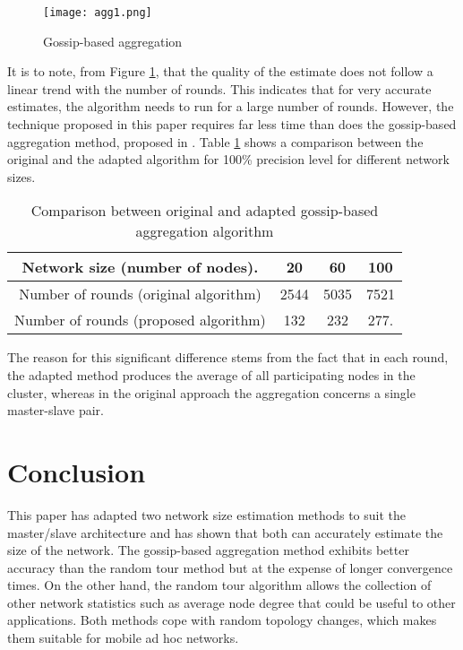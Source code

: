 \documentclass[twocolumn,10pt,conference]{IEEEtran}
\begin{document}
\begin{figure}[h!]
\begin{center}
\texttt{[image: agg1.png]}
\caption{Gossip-based aggregation}
\label{aggr}
\end{center}
\end{figure}

It is to note, from Figure \ref{aggr}, that the quality of the estimate does not follow a linear trend with the number of rounds. 
This indicates that for very accurate estimates, the algorithm needs to run for a large number of rounds. However, the 
technique proposed in this paper requires far less time than does the gossip-based aggregation method, proposed in 
\cite{ref22}. Table \ref{tbl} shows a comparison between the original and the adapted algorithm for 100\% precision level for 
different network sizes. 

\begin{table}[h!]
\caption{Comparison between original and adapted gossip-based aggregation algorithm}
\centering
\begin{tabular}{|c|c|c|c|}
\hline
Network size (number of nodes). & 20 & 60 & 100 \\
\hline
Number of rounds (original algorithm) & 2544 & 5035 & 7521\\
\hline
Number of rounds (proposed algorithm) & 132 & 232 & 277.\\
\hline
\end{tabular}
\label{tbl}
\end{table}
The reason for this significant difference stems from the fact that in each round, the adapted method produces the average of all participating nodes in the cluster, whereas in the original approach the aggregation concerns a single master-slave pair.

 
\section{Conclusion}
This paper has adapted two network size estimation methods to suit the master/slave architecture and has shown that both can 
accurately estimate the size of the network. The gossip-based aggregation method exhibits better accuracy than the random 
tour method but at the expense of longer convergence times. On the other hand, the random tour algorithm allows the 
collection of other network statistics such as average node degree that could be useful to other applications. Both methods cope with random topology 
changes, which makes them suitable for mobile ad hoc networks.




\end{document}
